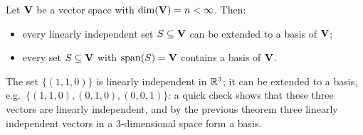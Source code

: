 \begin{theorem}
Let $\mathbf{V}$ be a vector space with $\dim(\mathbf{V}) = n<\infty$. Then:
\begin{itemize}
\item every linearly independent set $S\subseteq \mathbf{V}$ can be extended to a basis of $\mathbf{V}$;
\item every set $S\subseteq \mathbf{V}$ with $\operatorname{span}\!\left(S\right) = \mathbf{V}$ contains a basis of $\mathbf{V}$.
\end{itemize}
\end{theorem}

\begin{example}
The set $\{(1,1,0)\}$ is linearly independent in $\mathbb{R}^3$; it can be extended to a basis, e.g.\
$\{(1,1,0),(0,1,0),(0,0,1)\}$: a quick check shows that these three vectors are linearly independent, and
by the previous theorem three linearly independent vectors in a $3$-dimensional space form a basis.
\end{example}

